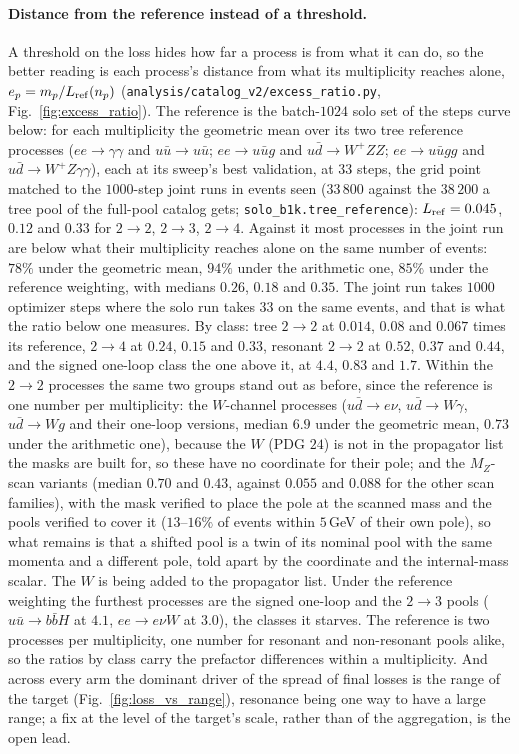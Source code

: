 \documentclass[11pt]{article}
\newcommand{\code}[1]{\texttt{#1}}
\begin{document}
\paragraph{Distance from the reference instead of a threshold.} A threshold on the loss
hides how far a process is from what it can do, so the better reading is each
process's distance from what its multiplicity reaches alone, $e_p=m_p/L_{\rm ref}(n_p)$ (\code{analysis/catalog\_v2/excess\_ratio.py},
Fig.~\ref{fig:excess_ratio}). The reference is the batch-$1024$ solo set of the steps curve
below: for each multiplicity the geometric mean over its two tree reference processes
($ee\to\gamma\gamma$ and $u\bar u\to u\bar u$; $ee\to u\bar ug$ and $u\bar d\to W^+ZZ$;
$ee\to u\bar ugg$ and $u\bar d\to W^+Z\gamma\gamma$), each at its sweep's best validation, at
$33$ steps, the grid point matched to the $1000$-step joint runs in events seen
($33\,800$ against the $38\,200$ a tree pool of the full-pool catalog gets; \code{solo\_b1k.tree\_reference}):
$L_{\rm ref}=0.045$, $0.12$ and $0.33$ for $2\to2$, $2\to3$, $2\to4$. Against it most processes
in the joint run are below what their multiplicity reaches alone on the same number of events:
$78\%$ under the geometric mean, $94\%$ under the arithmetic one, $85\%$ under the reference
weighting, with medians $0.26$, $0.18$ and $0.35$. The joint run takes $1000$ optimizer steps
where the solo run takes $33$ on the same events, and that is what the ratio below one measures.
By class: tree $2\to2$ at $0.014$, $0.08$ and $0.067$ times its reference, $2\to4$ at $0.24$,
$0.15$ and $0.33$, resonant $2\to2$ at $0.52$, $0.37$ and $0.44$, and the signed one-loop class
the one above it, at $4.4$, $0.83$ and $1.7$. Within the $2\to2$ processes the same two groups
stand out as before, since the reference is one number per multiplicity: the $W$-channel
processes ($u\bar d\to e\nu$, $u\bar d\to W\gamma$, $u\bar d\to Wg$ and their one-loop versions,
median $6.9$ under the geometric mean, $0.73$ under the arithmetic one), because the $W$ (PDG
$24$) is not in the propagator list the masks are built for, so these have no coordinate for
their pole; and the $M_Z$-scan variants (median $0.70$ and $0.43$, against $0.055$ and $0.088$
for the other scan families), with the mask verified to place the pole at the scanned mass and
the pools verified to cover it ($13$--$16\%$ of events within $5$\,GeV of their own pole), so
what remains is that a shifted pool is a twin of its nominal pool with the same momenta and a
different pole, told apart by the coordinate and the internal-mass scalar. The $W$ is being
added to the propagator list. Under the reference weighting the furthest processes are the
signed one-loop and the $2\to3$ pools ($u\bar u\to b\bar bH$ at $4.1$, $ee\to e\nu W$ at
$3.0$), the classes it starves. The reference is two processes per multiplicity, one number
for resonant and non-resonant pools alike, so the ratios by class carry the prefactor
differences within a multiplicity.
And across every arm the dominant driver of the spread of final losses is the range of the
target (Fig.~\ref{fig:loss_vs_range}), resonance being one way to have a large range; a fix
at the level of the target's scale, rather than of the aggregation, is the open lead.
\end{document}
